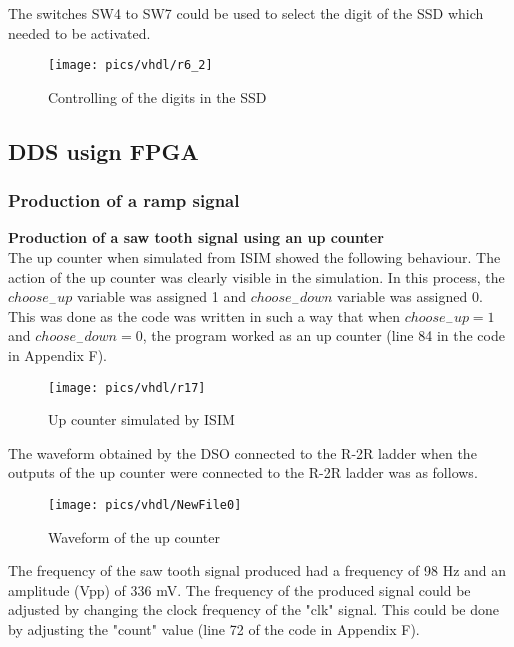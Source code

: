 \noindent
The switches SW4 to SW7 could be used to select the digit of the SSD which needed to be activated.  

\begin{figure}[!h]
	\centering
	\texttt{[image: pics/vhdl/r6\_2]}
	\caption{Controlling of the digits in the SSD}
	\label{fig:r6_2}
\end{figure}

\subsection{DDS usign FPGA}

\subsubsection{Production of a ramp signal}

\textbf{Production of a saw tooth signal using an up counter}\\

\noindent
The  up counter when simulated from ISIM showed the following behaviour. The action of the up counter was clearly visible in the simulation. In this process, the $  choose_{-}up $ variable was assigned 1 and $ choose_{-}down $ variable was assigned 0. This was done as the code was written in such a way that when  $ choose_{-}up = 1 $ and $ choose_{-}down = 0 $, the program worked as an up counter (line 84 in the code in Appendix F). 

\begin{figure}[!h]
	\centering
	\texttt{[image: pics/vhdl/r17]}
	\caption{Up counter simulated by ISIM}
	\label{fig:r17}
\end{figure}

\noindent
The waveform obtained by the DSO connected to the R-2R ladder when the outputs of the up counter were connected to the R-2R ladder was as follows.

\begin{figure}[!h]
	\centering
	\texttt{[image: pics/vhdl/NewFile0]}
	\caption{Waveform of the up counter}
	\label{fig:newfile0}
\end{figure}

\noindent
The frequency of the saw tooth signal produced had a frequency of 98 Hz and an amplitude (Vpp) of 336 mV. The frequency of the produced signal could be adjusted by changing the clock frequency of the "clk" signal. This could be done by adjusting the "count" value (line 72 of the code in Appendix F).\\

